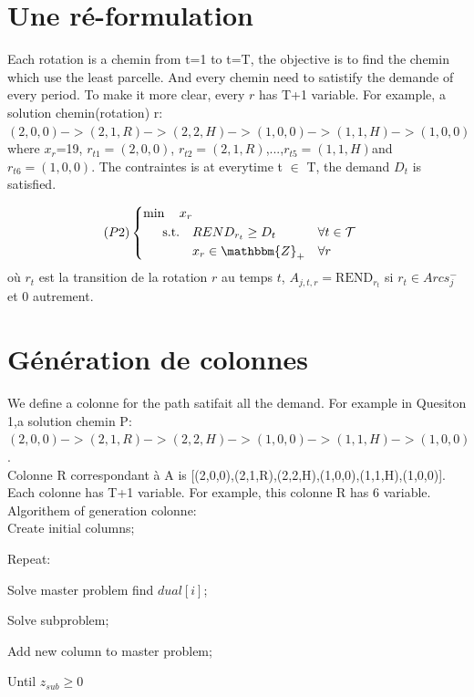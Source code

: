 \documentclass[a4paper]{article}
\begin{document}
\section{Une ré-formulation}
Each rotation is a chemin from t=1 to t=T, the objective is to find the chemin which use the least parcelle. And every chemin need to satistify the demande of every period. To make it more clear, every $r$ has T+1 variable. For example, a solution chemin(rotation) r: $(2,0,0)->(2,1,R)->(2,2,H)->(1,0,0)->(1,1,H)->(1,0,0)$ where $x_r$=19, $r_{t1}=(2,0,0)$,  $r_{t2}=(2,1,R)$,...,$r_{t5}=(1,1,H)$and $r_{t6}=(1,0,0)$. The contraintes is at everytime t $\in $ T, the demand $D_t$ is satisfied.

\begin{equation*}
    (P2) \left\{ 
    \begin{aligned}
    \min\quad   x_{r}   \\
    \text{s.t.\quad} & REND_{r_t} \geq D_{t} & & \forall t\in \mathcal{T}\\
                     & x_r \in \mathbbm{Z}_+            & & \forall r
  \end{aligned}
\right.
\end{equation*}
où $r_t$ est la transition de la rotation $r$ au temps $t$, $A_{j,t,r} = \text{REND}_{r_t}$ si $r_t \in Arcs^{-}_{j}$ et $0$ autrement. 

\section{Génération de colonnes}

We define a colonne for the path satifait all the demand. For example in Quesiton 1,a solution chemin P: $(2,0,0)->(2,1,R)->(2,2,H)->(1,0,0)->(1,1,H)->(1,0,0)$. \\
Colonne R correspondant à A is [(2,0,0),(2,1,R),(2,2,H),(1,0,0),(1,1,H),(1,0,0)]. Each colonne has T+1 variable. For example, this colonne R has 6 variable.
\\

		Algorithem of generation colonne:\\

		Create initial columns;
		
			Repeat:
			
					 Solve master problem find $dual[i]$;
					 
					 Solve subproblem;
					 
					 Add new column to master problem;
					 
	   		 Until $z_{sub} \geq 0$
\end{document}
